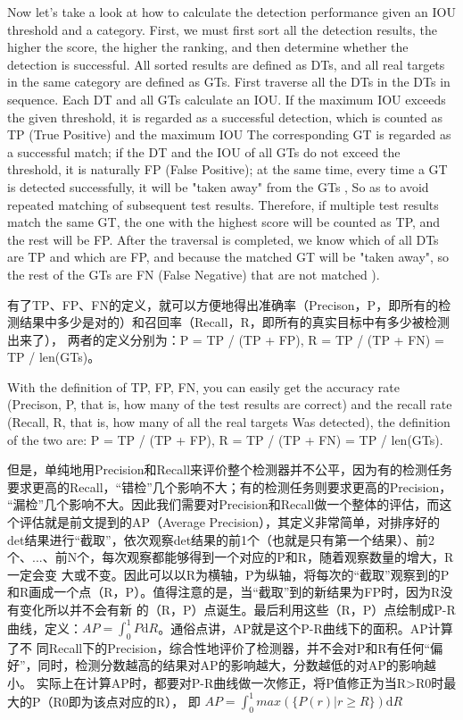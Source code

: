 \documentclass[UTF8]{ctexart}
\begin{document}
Now let's take a look at how to calculate the detection performance given an IOU threshold and a category. First, 
we must first sort all the detection results, the higher the score, the higher the ranking, and then determine whether 
the detection is successful. All sorted results are defined as DTs, and all real targets in the same category are defined as GTs. 
First traverse all the DTs in the DTs in sequence. Each DT and all GTs calculate an IOU. If the maximum IOU exceeds the given 
threshold, it is regarded as a successful detection, which is counted as TP (True Positive) and the maximum IOU The corresponding 
GT is regarded as a successful match; if the DT and the IOU of all GTs do not exceed the threshold, it is naturally FP 
(False Positive); at the same time, every time a GT is detected successfully, it will be "taken away" from the GTs , 
So as to avoid repeated matching of subsequent test results. Therefore, if multiple test results match the same GT, the one with 
the highest score will be counted as TP, and the rest will be FP. After the traversal is completed, we know which of all DTs are 
TP and which are FP, and because the matched GT will be "taken away", so the rest of the GTs are FN (False Negative) that are not
matched ).

有了TP、FP、FN的定义，就可以方便地得出准确率（Precison，P，即所有的检测结果中多少是对的）和召回率（Recall，R，即所有的真实目标中有多少被检测出来了），
两者的定义分别为：P = TP / (TP + FP), R = TP / (TP + FN) = TP / len(GTs)。

With the definition of TP, FP, FN, you can easily get the accuracy rate (Precison, P, that is, how many of the test results 
are correct) and the recall rate (Recall, R, that is, how many of all the real targets Was detected), the definition of the two 
are: P = TP / (TP + FP), R = TP / (TP + FN) = TP / len(GTs).

但是，单纯地用Precision和Recall来评价整个检测器并不公平，因为有的检测任务要求更高的Recall，“错检”几个影响不大；有的检测任务则要求更高的Precision，
“漏检”几个影响不大。因此我们需要对Precision和Recall做一个整体的评估，而这个评估就是前文提到的AP（Average Precision），其定义非常简单，对排序好的
det结果进行“截取”，依次观察det结果的前1个（也就是只有第一个结果）、前2个、...、前N个，每次观察都能够得到一个对应的P和R，随着观察数量的增大，R一定会变
大或不变。因此可以以R为横轴，P为纵轴，将每次的“截取”观察到的P和R画成一个点（R，P）。值得注意的是，当“截取”到的新结果为FP时，因为R没有变化所以并不会有新
的（R，P）点诞生。最后利用这些（R，P）点绘制成P-R曲线，定义：$AP=\int_{0}^{1}P\mathrm{d}R$。通俗点讲，AP就是这个P-R曲线下的面积。AP计算了不
同Recall下的Precision，综合性地评价了检测器，并不会对P和R有任何“偏好”，同时，检测分数越高的结果对AP的影响越大，分数越低的对AP的影响越小。
实际上在计算AP时，都要对P-R曲线做一次修正，将P值修正为当R>R0时最大的P（R0即为该点对应的R），
即 $AP=\int_{0}^{1}max(\{P(r)|r \geq R\})\mathrm{d}R$
\end{document}
